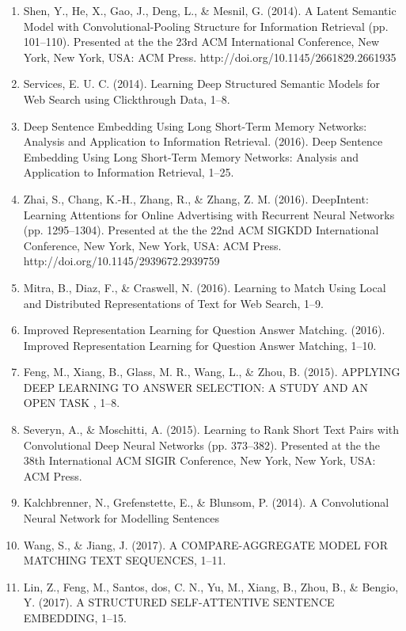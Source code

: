 \begin{enumerate}
\item Shen, Y., He, X., Gao, J., Deng, L., \& Mesnil, G. (2014). A Latent Semantic Model with Convolutional-Pooling Structure for Information Retrieval (pp. 101–110). Presented at the the 23rd ACM International Conference, New York, New York, USA: ACM Press. http://doi.org/10.1145/2661829.2661935
\item Services, E. U. C. (2014). Learning Deep Structured Semantic Models for Web Search using Clickthrough Data, 1–8.
\item Deep Sentence Embedding Using Long Short-Term Memory Networks: Analysis and Application to Information Retrieval. (2016). Deep Sentence Embedding Using Long Short-Term Memory Networks: Analysis and Application to Information Retrieval, 1–25.
\item Zhai, S., Chang, K.-H., Zhang, R., \& Zhang, Z. M. (2016). DeepIntent: Learning Attentions for Online Advertising with Recurrent Neural Networks
(pp. 1295–1304). Presented at the the 22nd ACM SIGKDD International Conference, New York, New York, USA: ACM Press. http://doi.org/10.1145/2939672.2939759
\item Mitra, B., Diaz, F., \& Craswell, N. (2016). Learning to Match Using Local and Distributed Representations of Text for Web Search, 1–9.
\item Improved Representation Learning for Question Answer Matching. (2016). Improved Representation Learning for Question Answer Matching, 1–10.
\item Feng, M., Xiang, B., Glass, M. R., Wang, L., \& Zhou, B. (2015). APPLYING DEEP LEARNING TO ANSWER SELECTION: A STUDY AND AN OPEN TASK , 1–8.
\item Severyn, A., \& Moschitti, A. (2015). Learning to Rank Short Text Pairs with Convolutional Deep Neural Networks (pp. 373–382). Presented at the the 38th International ACM SIGIR Conference, New York, New York, USA: ACM Press.
\item Kalchbrenner, N., Grefenstette, E., \& Blunsom, P. (2014). A Convolutional Neural Network for Modelling Sentences
\item Wang, S., \& Jiang, J. (2017). A COMPARE-AGGREGATE MODEL FOR MATCHING TEXT SEQUENCES, 1–11.
\item Lin, Z., Feng, M., Santos, dos, C. N., Yu, M., Xiang, B., Zhou, B., \& Bengio, Y. (2017). A STRUCTURED SELF-ATTENTIVE SENTENCE EMBEDDING, 1–15.
\end{enumerate}

